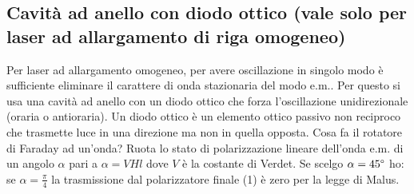 \documentclass{book}
\theoremstyle{remark}
\begin{document}
\subsection{Cavità ad anello con diodo ottico (vale solo per laser ad allargamento di riga omogeneo)}
Per laser ad allargamento omogeneo, per avere oscillazione in singolo modo è sufficiente eliminare il carattere di onda stazionaria del modo e.m.. Per questo si usa una cavità ad anello con un diodo ottico che forza l'oscillazione unidirezionale (oraria o antioraria).
Un diodo ottico è un elemento ottico passivo non reciproco che trasmette luce in una direzione ma non in quella opposta.
Cosa fa il rotatore di Faraday ad un'onda?
Ruota lo stato di polarizzazione lineare dell'onda e.m. di un angolo $\alpha$ pari a $\alpha = VHl$ dove $V$ è la costante di Verdet.
Se scelgo $\alpha = 45 \degree$ ho:
se $\alpha = \frac{\pi}{4}$ la trasmissione dal polarizzatore finale (1) è zero per la legge di Malus.
\end{document}
